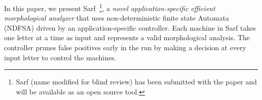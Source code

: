 \documentclass[11pt]{article}
\begin{document}
In this paper, we present Sarf~\footnote{Sarf (name modified for blind review) 
has been submitted with the paper and will be available 
as an open source tool.}, 
a {\em novel application-specific efficient 
morphological analyzer} that uses 
non-deterministic finite state Automata (NDFSA)
driven by an application-specific controller.
Each machine in Sarf takes one letter at a time as input
and represents a valid morphological analysis.
The controller prunes false positives
early in the run by making a decision at every input letter
to control the machines.
\end{document}
